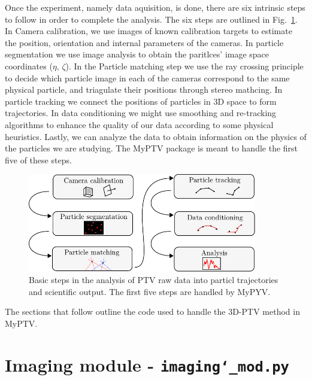 \documentclass[10pt,a4paper]{article}
\begin{document}
Once the experiment, namely data aquisition, is done, there are six intrinsic steps to follow in order to complete the analysis. The six steps are outlined in Fig.~\ref{fig:steps}. In Camera calibration, we use images of known calibration targets to estimate the position, orientation and internal parameters of the cameras. In particle segmentation we use image analysis to obtain the paritlces' image space coordinates ($\eta, \, \zeta$). In the Particle matching step we use the ray crossing principle to decide which particle image in each of the cameras correspond to the same physical particle, and triagulate their positions through stereo mathcing. In particle tracking we connect the positions of particles in 3D space to form trajectories. In data conditioning we might use smoothing and re-tracking algorithms to enhance the quality of our data according to some physical heuristics. Lastly, we can analyze the data to obtain information on the physics of the particles we are studying. The MyPTV package is meant to handle the first five of these steps.    



\begin{figure}
	\centering
	\includegraphics[width=10cm]{steps.pdf}
	\caption{Basic steps in the analysis of PTV raw data into particl trajectories and scientific output. The first five steps are handled by MyPYV. \label{fig:steps}}
\end{figure}


The sections that follow outline the code used to handle the 3D-PTV method in MyPTV.







\section{Imaging module - \texttt{imaging\char`_mod.py}}
\end{document}
